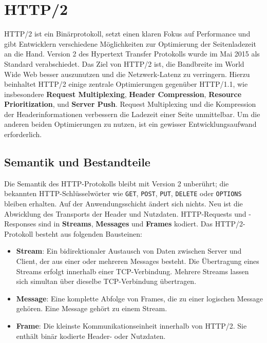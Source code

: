 \documentclass[a4paper, justified, notoc]{tufte-handout} %
\begin{document}
\section{HTTP/2} %
\label{sec:http_2}
HTTP/2 ist ein Binärprotokoll, setzt einen klaren Fokus auf Performance und gibt Entwicklern verschiedene Möglichkeiten zur Optimierung der Seitenladezeit an die Hand. 
Version 2 des Hypertext Transfer Protokolls wurde im Mai 2015 als Standard verabschiedet. 
Das Ziel von HTTP/2 ist, die Bandbreite im World Wide Web besser auszunutzen und die Netzwerk-Latenz zu verringern. Hierzu beinhaltet HTTP/2 einige zentrale Optimierungen gegenüber HTTP/1.1, wie insbesondere \textbf{Request Multiplexing}, \textbf{Header Compression}, \textbf{Resource Prioritization}, und \textbf{Server Push}.
Request Multiplexing und die Kompression der Headerinformationen verbessern die Ladezeit einer Seite unmittelbar. Um die anderen beiden Optimierungen zu nutzen, ist ein gewisser Entwicklungsaufwand erforderlich. 

\subsection{Semantik und Bestandteile} %
\label{sub:semantik_und_bestandteile}
Die Semantik des HTTP-Protokolls bleibt mit Version 2 unberührt; die bekannten HTTP-Schlüsselwörter wie \texttt{GET}, \texttt{POST}, \texttt{PUT}, \texttt{DELETE} oder \texttt{OPTIONS} bleiben erhalten. Auf der Anwendungsschicht ändert sich nichts. Neu ist die Abwicklung des Transports der Header und Nutzdaten. HTTP-Requests und -Responses sind in \textbf{Streams}, \textbf{Messages} und \textbf{Frames} kodiert. Das HTTP/2-Protokoll besteht aus folgenden Bausteinen:

\begin{itemize}
	\item \textbf{Stream}: Ein bidirektionaler Austausch von Daten zwischen Server und Client, der aus einer oder mehreren Messages besteht. Die Übertragung eines Streams erfolgt innerhalb einer TCP-Verbindung. Mehrere Streams lassen sich simultan über dieselbe TCP-Verbindung übertragen.
	\item \textbf{Message}: Eine komplette Abfolge von Frames, die zu einer logischen Message gehören. Eine Message gehört zu einem Stream.
	\item \textbf{Frame}: Die kleinste Kommunikationseinheit innerhalb von HTTP/2. Sie enthält binär kodierte Header- oder Nutzdaten.
\end{itemize}
\end{document}
